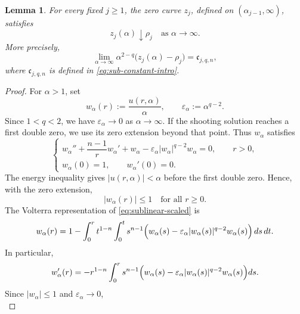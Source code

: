 \documentclass[11pt]{article}
\newtheorem{lemma}[theorem]{Lemma}
\begin{document}
\begin{lemma}
\label{lem:sublinear-bessel-limit}
For every fixed $j\ge1$, the zero curve \(z_j\), defined on
\((\alpha_{j-1},\infty)\), satisfies
\begin{equation}
 z_j(\alpha)\downarrow\rho_j
 \quad\text{as }\alpha\to\infty.
 \label{eq:sublinear-right-limit-general}
\end{equation}
More precisely,
\begin{equation}
 \lim_{\alpha\to\infty}\alpha^{2-q}\bigl(z_j(\alpha)-\rho_j\bigr)
 = \mathfrak c_{j,q,n},
 \label{eq:sublinear-first-order-zero}
\end{equation}
where $\mathfrak c_{j,q,n}$ is defined in
\eqref{eq:sub-constant-intro}.
\end{lemma}

\begin{proof}
For $\alpha>1$, set
\[
 w_\alpha(r):=\frac{u(r,\alpha)}{\alpha},
 \qquad
 \varepsilon_\alpha:=\alpha^{q-2}.
\]
Since $1<q<2$, we have $\varepsilon_\alpha\rightarrow0$ as $\alpha\to\infty$.
If the shooting solution reaches a first double zero, we use its zero extension beyond that point. Thus $w_\alpha$ satisfies
\begin{equation}
 \begin{cases}
 w_\alpha''+\dfrac{n-1}{r}w_\alpha'+w_\alpha
 -\varepsilon_\alpha|w_\alpha|^{q-2}w_\alpha=0,\qquad  r>0,\\[4pt]
 w_\alpha(0)=1,\qquad w_\alpha'(0)=0.
 \end{cases}
 \label{eq:sublinear-scaled}
\end{equation}
  The energy inequality gives
$|u(r,\alpha)|<\alpha$ before the first double zero. Hence, with the zero extension,
\begin{equation}
|w_\alpha(r)|\leq1
\quad\text{for all }r\geq0.
\label{eq:upper1}
\end{equation}
The Volterra representation of \eqref{eq:sublinear-scaled} is
\begin{align}
 w_\alpha(r)=1-
 \int_0^r t^{1-n}\int_0^t s^{n-1}
 \Bigl(w_\alpha(s)-\varepsilon_\alpha
 |w_\alpha(s)|^{q-2}w_\alpha(s)\Bigr)\,ds\,dt.
 \label{eq:sublinear-volterra}
\end{align}
In particular,
\begin{equation*}
w_\alpha'(r)=
-r^{1-n}\int_0^r s^{n-1}
\Bigl(
w_\alpha(s)
-\varepsilon_\alpha
|w_\alpha(s)|^{q-2}w_\alpha(s)
\Bigr)ds.
\end{equation*}
Since {$|w_\alpha|\leq1$} and $\varepsilon_\alpha\rightarrow0$,
\begin{equation*}

\end{equation*}
\end{proof}
\end{document}
